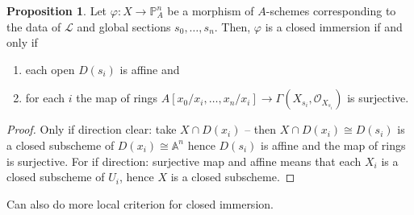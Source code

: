 \documentclass[10pt,reqno]{amsart}
\theoremstyle{definition}
\newtheorem{proposition}[theorem]{Proposition}
\theoremstyle{remark}
\numberwithin{equation}{section}
\numberwithin{theorem}{section}
\newcommand{\OO}{{\mathcal O}}
\newcommand{\LL}{{\mathscr L}}
\newcommand{\A}{{\mathbb A}}
\newcommand{\PP}{{\mathbb P}}
\begin{document}
\begin{proposition}
Let $\varphi: X \to \PP^n_A$ be a morphism of $A$-schemes corresponding to the data of $\LL$ and global sections $s_0,\dots,s_n$. Then, $\varphi$ is a closed immersion if and only if
\begin{enumerate}
\item each open $D(s_i)$ is affine and
\item for each $i$ the map of rings $A[x_0/x_i,\dots,x_n/x_i] \to \Gamma(X_{s_i}, \OO_{X_{s_i}})$ is surjective.
\end{enumerate}
\end{proposition}
\begin{proof}
Only if direction clear: take $X \cap D(x_i)$ -- then $X \cap D(x_i) \cong D(s_i)$ is a closed subscheme of $D(x_i) \cong \A^n$ hence $D(s_i)$ is affine and the map of rings is surjective. For if direction: surjective map and affine means that each $X_i$ is a closed subscheme of $U_i$, hence $X$ is a closed subscheme.
\end{proof}

Can also do more local criterion for closed immersion.
\end{document}
